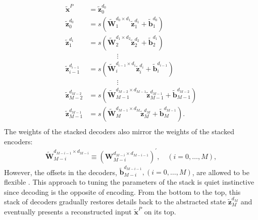 \documentclass[11pt]{article}
\newcommand{\vecEC}[1]{\boldsymbol{#1}}
\newcommand{\vecDC}[1]{\boldsymbol{\tilde{#1}}}
\newcommand{\WEC}{\vecEC{W}}                   %
\newcommand{\WEI}[3]{\WEC_{#1}^{d_{#2} \times d_{#3}}} %
\newcommand{\WDC}{\vecDC{W}}                   %
\newcommand{\WDI}[3]{\WDC_{#1}^{d_{#2} \times d_{#3}}} %
\newcommand{\bDC}{\vecDC{b}}    %
\newcommand{\bDI}[2]{\bDC_{#1}^{d_{#2}}} %
\newcommand{\xDC}{\vecDC{x}}
\newcommand{\zDC}{\vecDC{z}}
\newcommand{\zDI}[2]{\zDC_{#1}^{d_{#2}}}
\begin{document}
\begin{equation} \label{eq:SD}
  \begin{split}
    \xDC^P &= \zDI{0}{0} \\
    \zDI{0  }{0  } &= s(\WDI{1  }{0  }{1  } \zDI{1  }{1  } + \bDI{1  }{0  }) \\
    \zDI{1  }{1  } &= s(\WDI{2  }{1  }{2  } \zDI{2  }{2  } + \bDI{2  }{1  }) \\
    & \quad \quad \quad \quad \vdots \\
    \zDI{i-1}{i-1} &= s(\WDI{i  }{i-1}{i  } \zDI{i  }{i  } + \bDI{i  }{i-1}) \\
    & \quad \quad \quad \quad \vdots \\
    \zDI{M-2}{M-2} &= s(\WDI{M-1}{M-2}{M-1} \zDI{M-1}{M-1} + \bDI{M-1}{M-2}) \\
    \zDI{M-1}{M-1} &= s(\WDI{M  }{M-1}{M  } \zDI{M  }{M  } + \bDI{M  }{M-1}). \\
  \end{split}
\end{equation}
The weights of the stacked decoders also mirror the weights of the stacked encoders:
\begin{align}
  \WDI{M-i}{M-i-1}{M-i} \equiv {(\WEI{M-i}{M-i}{M-i-1})}^\prime, \quad (i=0, \dots, M),
\end{align}
However, the offsets in the decoders, $\bDI{M-i}{M-i-1}, (i=0, \dots, M)$, are allowed to be flexible \citep{DL:SDA1}. This approach to tuning the parameters of the stack is quiet instinctive since decoding is the opposite of encoding. From the bottom to the top, this stack of decoders gradually restores details back to the abstracted state $\zDI{M}{M}$ and eventually presents a reconstructed input $\xDC^P$ on its top.
\end{document}
